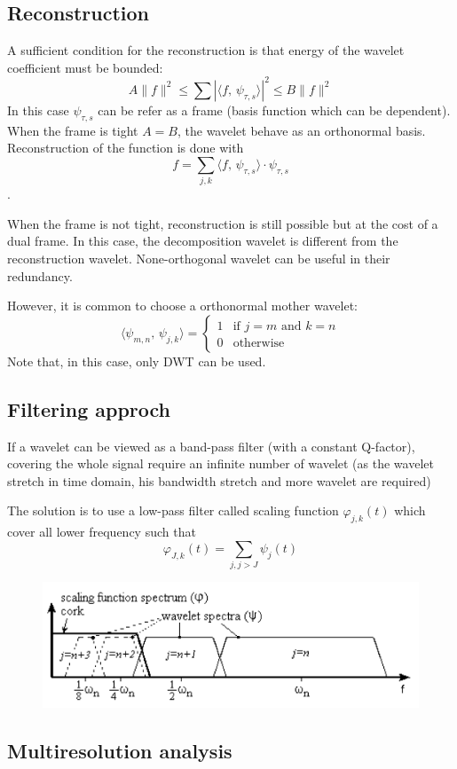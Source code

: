 \documentclass[twocolumn]{article}
\numberwithin{equation}{section}
\begin{document}
		\subsection{Reconstruction}
A sufficient condition for the reconstruction is that energy of the wavelet coefficient must be bounded:
$$ A\|f\|^2 \le \sum |\langle f,\,\psi_{\tau,s}\rangle|^2 \le B\|f\|^2$$
In this case $\psi_{\tau,s}$ can be refer as a frame (basis function which can be dependent). When the frame is tight $A=B$, the wavelet behave as an orthonormal basis. Reconstruction of the function is done with
$$ f=\sum_{j,k}\langle f,\,\psi_{\tau,s}\rangle\cdot\psi_{\tau,s}$$.

When the frame is not tight, reconstruction is still possible but at the cost of a dual frame. In this case, the decomposition wavelet is different from the reconstruction wavelet. None-orthogonal wavelet can be useful in their redundancy. 

However, it is common to choose a orthonormal mother wavelet:
$$\langle \psi_{m,n},\,\psi_{j,k}\rangle = \left\{
  \begin{array}{ll}
    1 & \text{if } j=m \text{ and } k=n\\
    0 & \text{otherwise}
  \end{array}
\right. $$
Note that, in this case, only DWT can be used.

		\subsection{Filtering approch}
If a wavelet can be viewed as a band-pass filter (with a constant Q-factor), covering the whole signal require an infinite number of wavelet (as the wavelet stretch in time domain, his bandwidth stretch and more wavelet are required)

The solution is to use a low-pass filter called scaling function $\varphi_{j,k}(t)$ which cover all lower frequency such that
$$\varphi_{J,k}(t)=\sum_{j, j>J} \psi_j(t)$$
\begin{figure}[H]
\centering
    \includegraphics[width=.49\textwidth]{wavelet_scaling_function.png}
\end{figure}

		\subsection{Multiresolution analysis}
\end{document}
